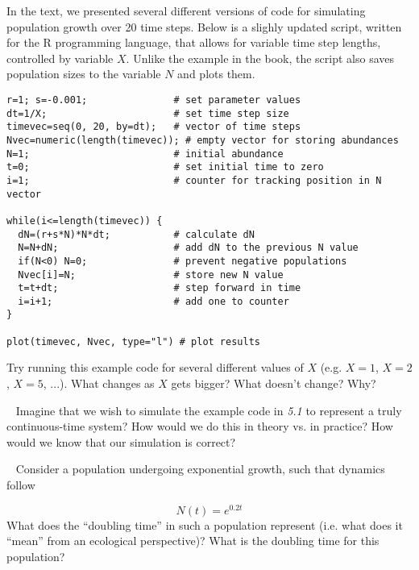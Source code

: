 \documentclass[12pt]{article}
\begin{document}
\date{}
\maketitle


\newline
In the text, we presented several different versions of code for simulating population growth over 20 time steps. Below is a slighly updated script, written for the R programming language, that allows for variable time step lengths, controlled by variable $X$. Unlike the example in the book, the script also saves population sizes to the variable $N$ and plots them.

\begin{verbatim}
r=1; s=-0.001;               # set parameter values
dt=1/X;                      # set time step size
timevec=seq(0, 20, by=dt);   # vector of time steps
Nvec=numeric(length(timevec)); # empty vector for storing abundances
N=1;                         # initial abundance
t=0;                         # set initial time to zero
i=1;                         # counter for tracking position in N vector

while(i<=length(timevec)) {
  dN=(r+s*N)*N*dt;           # calculate dN
  N=N+dN;                    # add dN to the previous N value
  if(N<0) N=0;               # prevent negative populations
  Nvec[i]=N;                 # store new N value
  t=t+dt;                    # step forward in time
  i=i+1;                     # add one to counter
}

plot(timevec, Nvec, type="l") # plot results
\end{verbatim}
Try running this example code for several different values of $X$ (e.g. $X = 1$, $X = 2$, $X = 5$, ...). What changes as $X$ gets bigger? What doesn't change? Why?



~\newline
{}
\newline
Imagine that we wish to simulate the example code in \textit{5.1} to represent a truly continuous-time system? How would we do this in theory vs. in practice? How would we know that our simulation is correct?

~\newline
{}
\newline
Consider a population undergoing exponential growth, such that dynamics follow

$$N(t) = e^{0.2t}$$
What does the ``doubling time'' in such a population represent (i.e. what does it ``mean'' from an ecological perspective)? What is the doubling time for this population?
\end{document}
